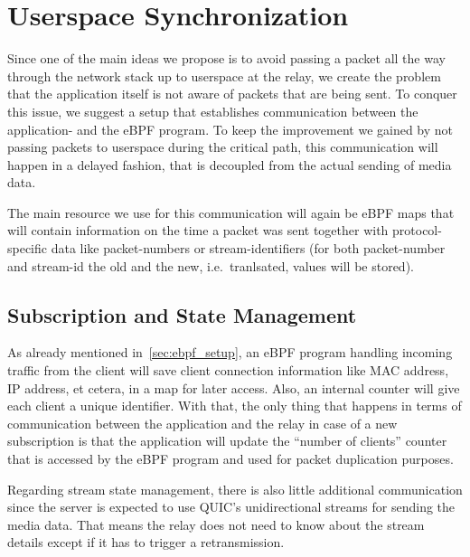 \section{Userspace Synchronization}\label{sec:userspace_synchronization}

Since one of the main ideas we propose is to avoid passing a packet all the way
through the network stack up to userspace at the relay, we create the problem
that the application itself is not aware of packets that are being sent.
To conquer this issue, we suggest a setup that establishes communication
between the application- and the eBPF program.
To keep the improvement we gained by not passing packets to userspace during the 
critical path, this communication will happen in a delayed fashion, that is 
decoupled from the actual sending of media data.

The main resource we use for this communication will again be eBPF maps that
will contain information on the time a packet was sent together with protocol-specific 
data like packet-numbers or stream-identifiers (for both packet-number 
and stream-id the old and the new, i.e.~tranlsated, values will be stored).



\subsection{Subscription and State Management}
As already mentioned in~\autoref{sec:ebpf_setup}, an eBPF program handling incoming
traffic from the client will save client connection information like MAC address, IP 
address, et cetera, in a map for later access.
Also, an internal counter will give each client a unique identifier. %
With that, the only thing that happens in terms of communication between the application 
and the relay in case of a new subscription is that the application will update the ``number 
of clients'' counter that is accessed by the eBPF program and used for packet duplication purposes.

Regarding stream state management, there is also little additional communication since the 
server is expected to use QUIC's unidirectional streams for sending the media data. 
That means the relay does not need to know about the stream details except if it 
has to trigger a retransmission.

